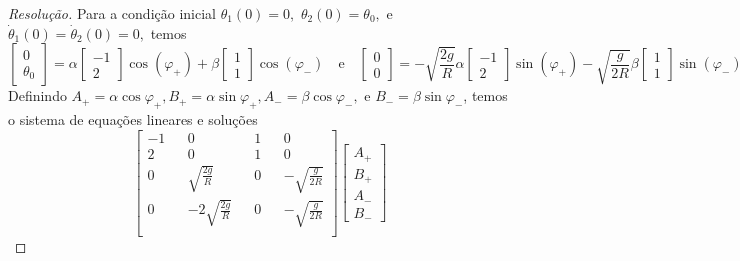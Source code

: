 \begin{proof}[Resolução]
    Para a condição inicial \(\theta_1(0) = 0,\) \(\theta_2(0) = \theta_0,\) e \(\dot\theta_1(0) = \dot\theta_2(0) = 0,\) temos
    \begin{equation*}
        \begin{bmatrix}
            0\\\theta_0
        \end{bmatrix}
        = \alpha \begin{bmatrix}
            -1\\2
        \end{bmatrix}
        \cos\left(\varphi_+\right)
        + \beta \begin{bmatrix}
            1\\1
        \end{bmatrix}
        \cos\left(\varphi_-\right)
        \quad\text{e}\quad
        \begin{bmatrix}
            0\\0
        \end{bmatrix}
        = -\sqrt{\frac{2g}{R}}\alpha \begin{bmatrix}
            -1\\2
        \end{bmatrix}
        \sin\left(\varphi_+\right)
        - \sqrt{\frac{g}{2R}}\beta \begin{bmatrix}
            1\\1
        \end{bmatrix}
        \sin\left(\varphi_-\right).
    \end{equation*}
    Definindo \(A_+ = \alpha \cos\varphi_+, B_+ = \alpha\sin\varphi_+,A_- = \beta \cos\varphi_-,\) e \(B_- = \beta\sin\varphi_-\), temos o sistema de equações lineares e soluções
    \begin{equation*}
        \begin{bmatrix}
            -1 && 0 && 1 && 0\\
            2 && 0 && 1 && 0\\
            0 && \sqrt{\frac{2g}{R}} && 0 && -\sqrt{\frac{g}{2R}}\\
            0 && -2\sqrt{\frac{2g}{R}} && 0 && -\sqrt{\frac{g}{2R}}\\
        \end{bmatrix}
        \begin{bmatrix}
            A_+\\ B_+\\A_-\\B_-
        \end{bmatrix}

\end{equation*}
\end{proof}
